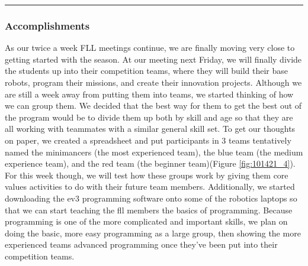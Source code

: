 \noindent\hfil\rule{\textwidth}{.4pt}\hfil

\subsubsection*{Accomplishments}
As our twice a week FLL meetings continue, we are finally moving very close to getting started with the season. At our meeting next Friday, we will finally divide the students up into their competition teams, where they will build their base robots, program their missions, and create their innovation projects. Although we are still a week away from putting them into teams, we started thinking of how we can group them. We decided that the best way for them to get the best out of the program would be to divide them up both by skill and age so that they are all working with teammates with a similar general skill set. To get our thoughts on paper, we created a spreadsheet and put participants in 3 teams tentatively named the minimancers (the most experienced team), the blue team (the medium experience team), and the red team (the beginner team)(Figure \ref{fig:101421_4}). For this week though, we will test how these groups work by giving them core values activities to do with their future team members.
Additionally, we started downloading the ev3 programming software onto some of the robotics laptops so that we can start teaching the fll members the basics of programming. Because programming is one of the more complicated and important skills, we plan on doing the basic, more easy programming as a large group, then showing the more experienced teams advanced programming once they’ve been put into their competition teams.

